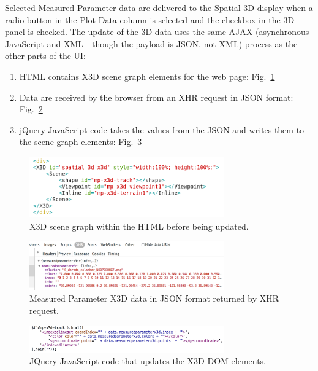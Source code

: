 \documentclass[conference]{IEEEtran}
\begin{document}
Selected Measured Parameter data are delivered to the Spatial 3D display when a radio button in the Plot Data column is selected and the checkbox in the 3D panel is checked. The update of the 3D data uses the same AJAX (asynchronous JavaScript and XML - though the payload is JSON, not XML) process as the other parts of the UI:

\begin{enumerate}
\item HTML contains X3D scene graph elements for the web page: Fig.~\ref{fig:Spatial3D_DOM}
\item Data are received by the browser from an XHR request in JSON format: Fig.~\ref{fig:JSONData}
\item jQuery JavaScript code takes the values from the JSON and writes them to the scene graph elements: Fig.~\ref{fig:jQueryDOMUpdateGeo}
\end{enumerate}

\begin{figure}[!htbp]
\centering
\includegraphics[width=3.3in]{Spatial3D_DOM.png}
\caption{X3D scene graph within the HTML before being updated.}
\label{fig:Spatial3D_DOM}
\end{figure}

\begin{figure}[!htbp]
\centering
\includegraphics[width=3.3in]{JSONData.png}
\caption{Measured Parameter X3D data in JSON format returned by XHR request.}
\label{fig:JSONData}
\end{figure}

\begin{figure}[!htbp]
\centering
\includegraphics[width=3.3in]{jQueryDOMUpdateGeo.png}
\caption{JQuery JavaScript code that updates the X3D DOM elements.}
\label{fig:jQueryDOMUpdateGeo}
\end{figure}
\end{document}
